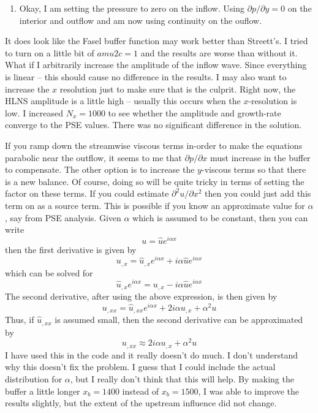 \documentclass[12pt]{article}
\begin{document}
\begin{enumerate}
\item Okay, I am setting the pressure to zero on the inflow.  Using $\partial
p/\partial y=0$ on the interior and outflow and am now using continuity on the
ouflow.

\end{enumerate}

It does look like the Fasel buffer function may work better than Streett's.  I
tried to turn on a little bit of $amu2c=1$ and the results are worse than
without it. What if I arbitrarily increase the amplitude of the inflow wave.
Since everything is linear -- this should cause no difference in the results.
I may also want to increase the $x$ resolution just to make sure that is the
culprit.  Right now, the HLNS amplitude is a little high -- usually this
occurs when the $x$-resolution is low.  I increased $N_x=1000$ to see whether
the amplitude and growth-rate converge to the PSE values.  There was no
significant difference in the solution.

If you ramp down the streamwise viscous terms in-order to make the equations
parabolic near the outflow, it seems to me that $\partial p/\partial x$ must
increase in the buffer to compensate.  The other option is to increase the
$y$-viscous terms so that there is a new balance.  Of course, doing so will be
quite tricky in terms of setting the factor on these terms.  If you could
estimate $\partial^2 u/\partial x^2$ then you could just add this term on as a
source term.  This is possible if you know an approximate value for $\alpha$,
say from PSE analysis.  Given $\alpha$ which is assumed to be constant, then
you can write
%
\begin{equation}
  u = \hat u e^{i\alpha x}
\end{equation}
%
then the first derivative is given by
%
\begin{equation}
  u_{,x} = \hat u_{,x} e^{i\alpha x} + i \alpha \hat u e^{i\alpha x}
\end{equation}
%
which can be solved for
%
\begin{equation}
  \hat u_{,x} e^{i\alpha x} =  u_{,x} - i \alpha \hat u e^{i\alpha x}
\end{equation}
%
The second derivative, after using the above expression, is then given by
%
\begin{equation}
  u_{,xx} = \hat u_{,xx} e^{i\alpha x} + 2i\alpha u_{,x} + \alpha^2 u
\end{equation}
%
Thus, if $\hat u_{,xx}$ is assumed small, then the second derivative can be
approximated by
%
\begin{equation}
  u_{,xx} \approx 2i\alpha u_{,x} + \alpha^2 u
\end{equation}
%
I have used this in the code and it really doesn't do much.  I don't
understand why this doesn't fix the problem.  I guess that I could include the
actual distribution for $\alpha$, but I really don't think that this will
help.  By making the buffer a little longer $x_b=1400$ instead of $x_b=1500$,
I was able to improve the results slightly, but the extent of the upstream
influence did not change.  
\end{document}
